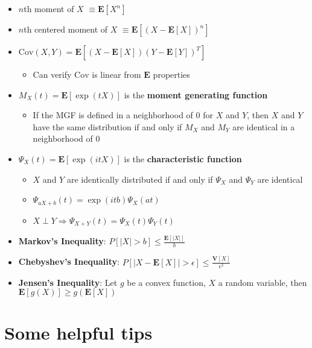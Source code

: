\documentclass[12pt,english]{article}
\begin{document}
\begin{itemize}
\begin{itemize}
	\end{itemize}
	\item $n$th moment of $X$ $\equiv \mathbf{E}[X^{n}]$
	\item $n$th centered moment of $X$ $\equiv \mathbf{E}[(X - \mathbf{E}[X])^{n}]$
	\item $\text{Cov}(X, Y) = \mathbf{E}[(X - \mathbf{E}[X])(Y - \mathbf{E}[Y])^{T}]$
	\begin{itemize}
		\item Can verify $\text{Cov}$ is linear from $\mathbf{E}$ properties
	\end{itemize}
	\item $M_{X}(t) = \mathbf{E}[\exp(tX)]$ is the \textbf{moment generating function}
	\begin{itemize}
		\item If the MGF is defined in a neighborhood of 0 for $X$ and $Y$, then $X$ and $Y$ have the same distribution if and only if $M_{X}$ and $M_{Y}$ are identical in a neighborhood of 0
	\end{itemize}
	\item $\Psi_{X}(t) = \mathbf{E}[\exp(itX)]$ is the \textbf{characteristic function}
	\begin{itemize}
		\item $X$ and $Y$ are identically distributed if and only if $\Psi_{X}$ and $\Psi_{Y}$ are identical
		\item $\Psi_{aX + b}(t) = \exp(itb) \Psi_{X}(at)$
		\item $X \perp Y \Rightarrow \Psi_{X + Y}(t) = \Psi_{X}(t) \Psi_{Y}(t)$
	\end{itemize}
	\item \textbf{Markov's Inequality}: $P[|X| > b] \leq \frac{\mathbf{E}[|X|]}{b}$
	\item \textbf{Chebyshev's Inequality}: $P[|X - \mathbf{E}[X]| > \epsilon] \leq \frac{\mathbf{V}[X]}{\epsilon^{2}}$
	\item \textbf{Jensen's Inequality}: Let $g$ be a convex function, $X$ a random variable, then $\mathbf{E}[g(X)] \geq g(\mathbf{E}[X])$
\end{itemize}

\section{Some helpful tips}
\end{document}
